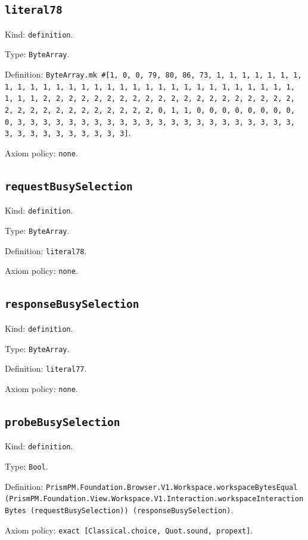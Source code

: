 \documentclass[11pt]{article}
\begin{document}
\subsection*{\texttt{literal78}}
\noindent Kind: \texttt{definition}.\par
\noindent Type: \texttt{ByteArray}.\par
\noindent Definition: \texttt{ByteArray.mk \#[1, 0, 0, 79, 80, 86, 73, 1, 1, 1, 1, 1, 1, 1, 1, 1, 1, 1, 1, 1, 1, 1, 1, 1, 1, 1, 1, 1, 1, 1, 1, 1, 1, 1, 1, 1, 1, 1, 1, 1, 2, 2, 2, 2, 2, 2, 2, 2, 2, 2, 2, 2, 2, 2, 2, 2, 2, 2, 2, 2, 2, 2, 2, 2, 2, 2, 2, 2, 2, 2, 2, 2, 0, 1, 1, 0, 0, 0, 0, 0, 0, 0, 0, 0, 3, 3, 3, 3, 3, 3, 3, 3, 3, 3, 3, 3, 3, 3, 3, 3, 3, 3, 3, 3, 3, 3, 3, 3, 3, 3, 3, 3, 3, 3, 3, 3]}.\par
\noindent Axiom policy: \texttt{none}.\par
\subsection*{\texttt{requestBusySelection}}
\noindent Kind: \texttt{definition}.\par
\noindent Type: \texttt{ByteArray}.\par
\noindent Definition: \texttt{literal78}.\par
\noindent Axiom policy: \texttt{none}.\par
\subsection*{\texttt{responseBusySelection}}
\noindent Kind: \texttt{definition}.\par
\noindent Type: \texttt{ByteArray}.\par
\noindent Definition: \texttt{literal77}.\par
\noindent Axiom policy: \texttt{none}.\par
\subsection*{\texttt{probeBusySelection}}
\noindent Kind: \texttt{definition}.\par
\noindent Type: \texttt{Bool}.\par
\noindent Definition: \texttt{PrismPM.Foundation.Browser.V1.Workspace.workspaceBytesEqual (PrismPM.Foundation.View.Workspace.V1.Interaction.workspaceInteractionBytes (requestBusySelection)) (responseBusySelection)}.\par
\noindent Axiom policy: \texttt{exact [Classical.choice, Quot.sound, propext]}.\par
\end{document}
